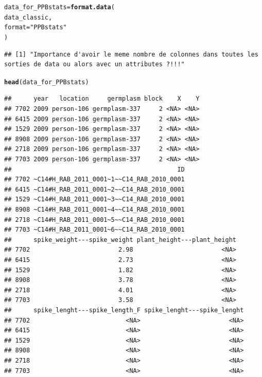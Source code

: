 \documentclass{article}\usepackage[]{graphicx}\usepackage[]{color}
\makeatletter
\newcommand{\hlstr}[1]{\textcolor[rgb]{0.192,0.494,0.8}{#1}}%
\newcommand{\hlstd}[1]{\textcolor[rgb]{0.345,0.345,0.345}{#1}}%
\newcommand{\hlkwb}[1]{\textcolor[rgb]{0.69,0.353,0.396}{#1}}%
\newcommand{\hlkwc}[1]{\textcolor[rgb]{0.333,0.667,0.333}{#1}}%
\newcommand{\hlkwd}[1]{\textcolor[rgb]{0.737,0.353,0.396}{\textbf{#1}}}%
\newenvironment{kframe}{%
 \def\at@end@of@kframe{}%
 \ifinner\ifhmode%
  \def\at@end@of@kframe{\end{minipage}}%
  \begin{minipage}{\columnwidth}%
 \fi\fi%
 \def\FrameCommand##1{\hskip\@totalleftmargin \hskip-\fboxsep
 \colorbox{shadecolor}{##1}\hskip-\fboxsep
     \hskip-\linewidth \hskip-\@totalleftmargin \hskip\columnwidth}%
 \MakeFramed {\advance\hsize-\width
   \@totalleftmargin\z@ \linewidth\hsize
   \@setminipage}}%
 {\par\unskip\endMakeFramed%
 \at@end@of@kframe}
\newenvironment{knitrout}{}{} %
\makeatother
\begin{document}
\begin{itemize}
\begin{knitrout}
\color{fgcolor}\begin{kframe}
\begin{alltt}
\hlstd{data_for_PPBstats} \hlkwb{=} \hlkwd{format.data}\hlstd{(}
        \hlstd{data_classic,}
        \hlkwc{format} \hlstd{=} \hlstr{"PPBstats"}
\hlstd{)}
\end{alltt}
\begin{verbatim}
## [1] "Importance d'avoir le meme nombre de colonnes dans toutes les sorties de data ou alors avec un attributes ?!!!"
\end{verbatim}
\begin{alltt}
\hlkwd{head}\hlstd{(data_for_PPBstats)}
\end{alltt}
\begin{verbatim}
##      year   location     germplasm block    X    Y
## 7702 2009 person-106 germplasm-337     2 <NA> <NA>
## 6415 2009 person-106 germplasm-337     2 <NA> <NA>
## 1529 2009 person-106 germplasm-337     2 <NA> <NA>
## 8908 2009 person-106 germplasm-337     2 <NA> <NA>
## 2718 2009 person-106 germplasm-337     2 <NA> <NA>
## 7703 2009 person-106 germplasm-337     2 <NA> <NA>
##                                             ID
## 7702 ~C14#H_RAB_2011_0001~1~~C14_RAB_2010_0001
## 6415 ~C14#H_RAB_2011_0001~2~~C14_RAB_2010_0001
## 1529 ~C14#H_RAB_2011_0001~3~~C14_RAB_2010_0001
## 8908 ~C14#H_RAB_2011_0001~4~~C14_RAB_2010_0001
## 2718 ~C14#H_RAB_2011_0001~5~~C14_RAB_2010_0001
## 7703 ~C14#H_RAB_2011_0001~6~~C14_RAB_2010_0001
##      spike_weight---spike_weight plant_height---plant_height
## 7702                        2.98                        <NA>
## 6415                        2.73                        <NA>
## 1529                        1.82                        <NA>
## 8908                        3.78                        <NA>
## 2718                        4.01                        <NA>
## 7703                        3.58                        <NA>
##      spike_lenght---spike_length_F spike_lenght---spike_lenght
## 7702                          <NA>                        <NA>
## 6415                          <NA>                        <NA>
## 1529                          <NA>                        <NA>
## 8908                          <NA>                        <NA>
## 2718                          <NA>                        <NA>
## 7703                          <NA>                        <NA>
\end{verbatim}
\end{kframe}
\end{knitrout}


\end{itemize}
\end{document}
